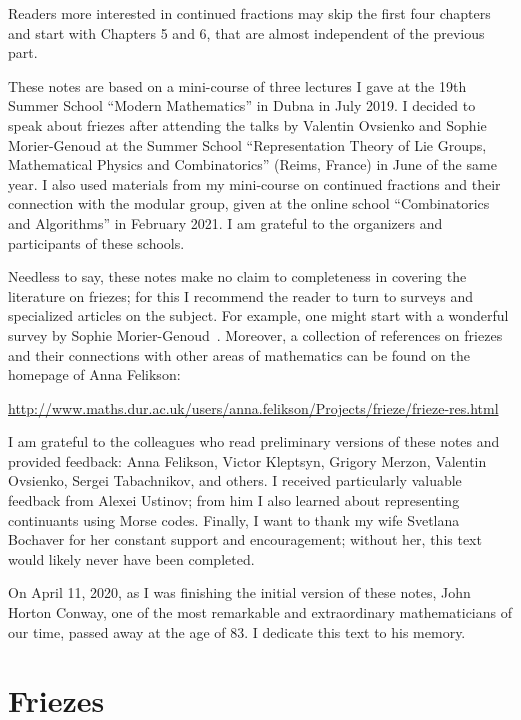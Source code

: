 \documentclass[a4paper,11pt]{amsart}
\theoremstyle{plain}
\theoremstyle{remark}
\theoremstyle{definition}
\numberwithin{equation}{section}
\numberwithin{figure}{section}
\begin{document}
Readers more interested in continued fractions may skip the first four chapters and start with Chapters 5 and 6, that are almost independent of the previous part.

\bigskip

These notes are based on a mini-course of three lectures I gave at the 19th Summer School ``Modern Mathematics'' in Dubna in July 2019. I decided to speak about friezes after attending the talks by Valentin Ovsienko and Sophie Morier-Genoud at the Summer School ``Representation Theory of Lie Groups, Mathematical Physics and Combinatorics'' (Reims, France) in June of the same year. I also used materials from my mini-course on continued fractions and their connection with the modular group, given at the online school ``Combinatorics and Algorithms'' in February 2021. I am grateful to the organizers and participants of these schools.

Needless to say, these notes make no claim to completeness in covering the literature on friezes; for this I recommend the reader to turn to surveys and specialized articles on the subject. For example, one might start with a wonderful survey by  Sophie Morier-Genoud~\cite{Morier15}. Moreover, a collection of references on friezes and their connections with other areas of mathematics can be found on the homepage of Anna Felikson:

\medskip

\noindent\url{http://www.maths.dur.ac.uk/users/anna.felikson/Projects/frieze/frieze-res.html}

\medskip

I am grateful to the colleagues who read preliminary versions of these notes and provided feedback: Anna Felikson, Victor Kleptsyn, Grigory Merzon, Valentin Ovsienko, Sergei Tabachnikov, and others. I received particularly valuable feedback from Alexei Ustinov; from him I also learned about representing continuants using Morse codes. Finally, I want to thank my wife Svetlana Bochaver for her constant support and encouragement; without her, this text would likely never have been completed.
\bigskip

On April 11, 2020, as I was finishing the initial version of these notes, John Horton Conway, one of the most remarkable and extraordinary mathematicians of our time,  passed away at the age of 83. I dedicate this text to his memory.

\section{Friezes}
\end{document}

